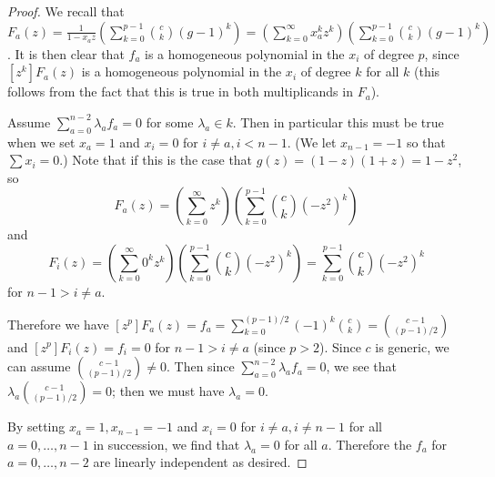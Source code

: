 \documentclass{article}
\numberwithin{equation}{section}
\begin{document}
\begin{proof} 
We recall that $F_a(z)=\frac{1}{1-x_az}\left(\sum_{k=0}^{p-1} \binom{c}{k} (g-1)^k\right)=\left(\sum_{k=0}^\infty x_a^kz^k\right)\left(\sum_{k=0}^{p-1} \binom{c}{k} (g-1)^k\right)$. It is then clear that $f_a$ is a homogeneous polynomial in the $x_i$ of degree $p$, since $[z^k]F_a(z)$ is a homogeneous polynomial in the $x_i$ of degree $k$ for all $k$ (this follows from the fact that this is true in both multiplicands in $F_a$). 

Assume $\sum_{a=0}^{n-2} \lambda_af_a=0$ for some $\lambda_a \in k$. Then in particular this must be true when we set $x_a=1$ and $x_i=0$ for $i \ne a,i < n-1$. (We let $x_{n-1}=-1$ so that $\sum x_i=0$.) Note that if this is the case that $g(z)=(1-z)(1+z)=1-z^2$, so $$F_a(z)=\left(\sum_{k=0}^\infty z^k\right)\left(\sum_{k=0}^{p-1} \binom{c}{k} (-z^2)^k\right)$$ and $$F_i(z)=\left(\sum_{k=0}^\infty 0^kz^k\right)\left(\sum_{k=0}^{p-1} \binom{c}{k} (-z^2)^k\right)=\sum_{k=0}^{p-1} \binom{c}{k} (-z^2)^k$$ for $n-1>i \ne a$.

Therefore we have $[z^p]F_a(z)=f_a=\sum_{k=0}^{(p-1)/2} (-1)^k\binom{c}{k}=\binom{c-1}{(p-1)/2}$ and $[z^p]F_i(z)=f_i=0$ for $n-1>i \ne a$ (since $p > 2$). Since $c$ is generic, we can assume $\binom{c-1}{(p-1)/2} \ne 0$. Then since $\sum_{a=0}^{n-2} \lambda_af_a=0$, we see that $\lambda_a\binom{c-1}{(p-1)/2}=0$; then we must have $\lambda_a=0$.

By setting $x_a=1,x_{n-1}=-1$ and $x_i=0$ for $i \ne a, i \ne n-1$ for all $a=0,\dots,n-1$ in succession, we find that $\lambda_a=0$ for all $a$. Therefore the $f_a$ for $a=0,\dots,n-2$ are linearly independent as desired.



\end{proof}
\end{document}

